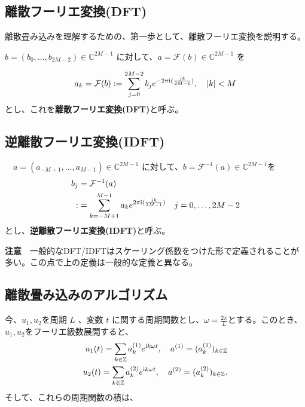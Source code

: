 
%

\subsection{離散フーリエ変換(DFT)}
離散畳み込みを理解するための、第一歩として、離散フーリエ変換を説明する。

\begin{df} $b = (b_0, \dots , b_{2M-2}) \in \mathbb{C}^{2M-1} $ に対して、$a = \mathcal{F}(b) \in \mathbb{C}^{2M-1}$ を

$$
a_k = \mathcal{F}(b) := \sum_{j=0}^{2M-2} b_j e^{-2\pi \mathrm{i} (\frac{jk}{2M-1}) },\quad |k|<M
$$
とし、これを\textbf{離散フーリエ変換(DFT)}と呼ぶ。
\end{df}

\subsection{逆離散フーリエ変換(IDFT)}
\begin{df}　$a = (a_{-M+1}, \dots , a_{M-1}) \in \mathbb{C}^{2M-1}$ に対して、$b = \mathcal{F}^{-1} (a) \in \mathbb{C}^{2M-1}$を
\begin{align*}
b_j &= \mathcal{F}^{-1} (a) \\
:&= \sum_{k = -M+1}^{M-1} a_k e^{2 \pi \mathrm{i} (\frac{jk}{2M-1})} \quad j=0, \dots , 2M-2
\end{align*}
とし、\textbf{逆離散フーリエ変換(IDFT)}と呼ぶ。
\end{df}

\textbf{注意}　一般的なDFT/IDFTはスケーリング係数をつけた形で定義されることが多い。この点で上の定義は一般的な定義と異なる。

\subsection{離散畳み込みのアルゴリズム}

今、$u_1, u_2$を周期 $L$ 、変数 $t$ に関する周期関数とし、$\omega = \frac{2\pi}{L}$とする。このとき、$u_1, u_2$をフーリエ級数展開すると、
\begin{align*}
    u_1(t) = \sum_{k \in \mathbb{Z}} a_{k}^{(1)} e^{\mathrm{i} k\omega t} , \quad a^{(1)} = (a_{k}^{(1)})_{k \in \mathbb{Z}} \\
    u_2(t) = \sum_{k \in \mathbb{Z}} a_{k}^{(2)} e^{\mathrm{i} k\omega t} , \quad a^{(2)} = (a_{k}^{(2)})_{k \in \mathbb{Z}}.
\end{align*}
そして、これらの周期関数の積は、

